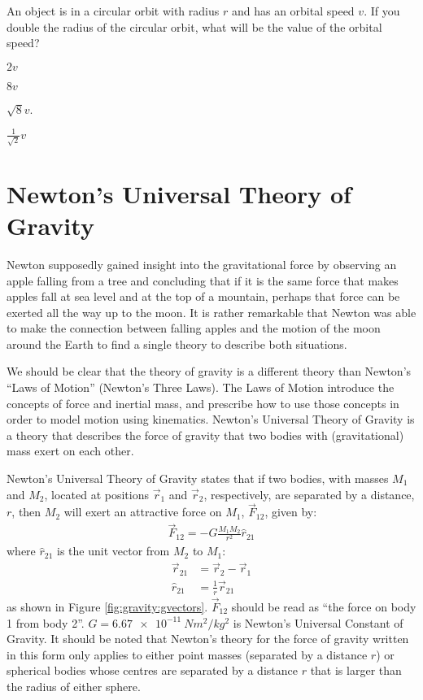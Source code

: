 \begin{checkpoint}
\begin{MCquestion}{An object is in a circular orbit with radius $r$ and has an orbital speed $v$. If you double the radius of the circular orbit, what will be the value of the orbital speed?}
\item $2v$
\item $8v$
\item $\sqrt{8}v$.
\item $\frac{1}{\sqrt{2}}v$ \correct
\end{MCquestion}
\end{checkpoint}

\section{Newton's Universal Theory of Gravity}
Newton supposedly gained insight into the gravitational force by observing an apple falling from a tree and concluding that if it is the same force that makes apples fall at sea level and at the top of a mountain, perhaps that force can be exerted all the way up to the moon. It is rather remarkable that Newton was able to make the connection between falling apples and the motion of the moon around the Earth to find a single theory to describe both situations.

We should be clear that the theory of gravity is a different theory than Newton's ``Laws of Motion'' (Newton's Three Laws). The Laws of Motion introduce the concepts of force and inertial mass, and prescribe how to use those concepts in order to model motion using kinematics. Newton's Universal Theory of Gravity is a theory that describes the force of gravity that two bodies with (gravitational) mass exert on each other.

Newton's Universal Theory of Gravity states that if two bodies, with masses $M_1$ and $M_2$, located at positions $\vec r_1$ and $\vec r_2$, respectively, are separated by a distance, $r$, then $M_2$ will exert an attractive force on $M_1$, $\vec F_{12}$, given by:
\begin{align}
\vec F_{12}=-G\frac{M_1M_2}{r^2}\hat r_{21}
\end{align}
where $\hat r_{21}$ is the unit vector from $M_2$ to $M_1$:
\begin{align*}
\vec r_{21} &= \vec r_2 - \vec r_1\\
\hat r_{21} &= \frac{1}{r} \vec r_{21}
\end{align*}
as shown in Figure \ref{fig:gravity:gvectors}. $\vec F_{12}$ should be read as ``the force on body 1 from body 2''. $G=\SI{6.67e-11}{Nm^2/kg^2}$ is Newton's Universal Constant of Gravity. It should be noted that Newton's theory for the force of gravity written in this form only applies to either point masses (separated by a distance $r$) or spherical bodies whose centres are separated by a distance $r$ that is larger than the radius of either sphere.

